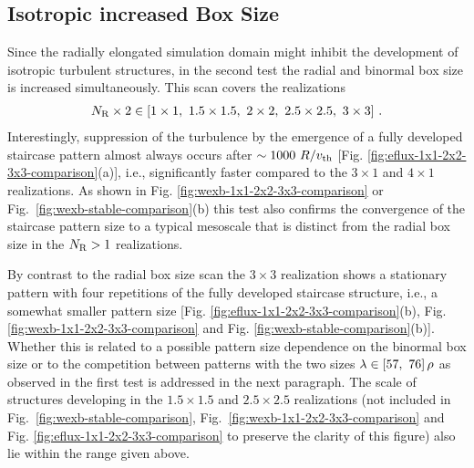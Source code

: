 \newpage
\subsection{Isotropic increased Box Size}
\label{sub:isotropic}

Since the radially elongated simulation domain might inhibit the development of isotropic turbulent structures, in the second test the radial and binormal box size is increased simultaneously.
This scan covers the realizations
\begin{gather*}
	N_\mathrm{R}\times2 \in [1\times1,~1.5\times1.5,~2\times2,~2.5\times2.5,~3\times3]~.
\end{gather*}
Interestingly, suppression of the turbulence by the emergence of a fully developed staircase pattern almost always occurs after $\sim 1000~R/v_{\mathrm{th}}$ [Fig. \ref{fig:eflux-1x1-2x2-3x3-comparison}(a)], i.e., significantly faster compared to the $3\times1$ and $4\times1$ realizations. 
As shown in Fig. \ref{fig:wexb-1x1-2x2-3x3-comparison} or Fig.~\ref{fig:wexb-stable-comparison}(b) this test also confirms the convergence of the staircase pattern size to a typical mesoscale that is distinct from the radial box size in the $N_\mathrm{R} > 1$ realizations.


By contrast to the radial box size scan the $3\times3$ realization shows a stationary pattern with four repetitions of the fully developed staircase structure, i.e., a somewhat smaller pattern size [Fig. \ref{fig:eflux-1x1-2x2-3x3-comparison}(b), Fig. \ref{fig:wexb-1x1-2x2-3x3-comparison} and Fig. \ref{fig:wexb-stable-comparison}(b)]. 
Whether this is related to a possible pattern size dependence on the binormal box size or to the competition between patterns with the two sizes $\lambda \in [57,~ 76]\,\rho$ as observed in the first test is addressed in the next paragraph.
The scale of structures developing in the $1.5\times1.5$ and $2.5\times2.5$ realizations (not included in Fig.~\ref{fig:wexb-stable-comparison}, Fig.~\ref{fig:wexb-1x1-2x2-3x3-comparison} and Fig. \ref{fig:eflux-1x1-2x2-3x3-comparison} to preserve the clarity of this figure) also lie within the range given above.


